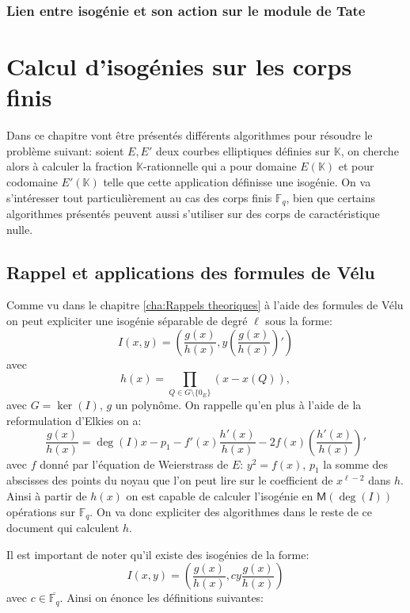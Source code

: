 \documentclass[10pt,a4paper]{book}
\theoremstyle{plain}
\theoremstyle{definition}
\theoremstyle{definition}
\theoremstyle{definition}
\theoremstyle{definition}
\theoremstyle{remark}
\theoremstyle{remark}
\begin{document}
\subsection{Lien entre isogénie et son action sur le module de Tate}

\chapter{Calcul d'isogénies sur les corps finis}
Dans ce chapitre vont être présentés différents algorithmes pour résoudre le problème suivant: soient $E, E'$ deux courbes elliptiques définies sur $\mathbb{K}$, on cherche alors à calculer la fraction $\mathbb{K}$-rationnelle qui a pour domaine $E(\mathbb{K})$ et pour codomaine $E'(\mathbb{K})$  telle que  cette application  définisse une isogénie.
On va s'intéresser tout particulièrement au cas des corps finis $\mathbb{F}_q$, bien que certains algorithmes présentés peuvent aussi s'utiliser sur des corps de caractéristique nulle.

\section{Rappel et applications des formules de Vélu}
Comme vu dans le chapitre \ref{cha:Rappels theoriques} à l'aide des formules de Vélu on peut expliciter une isogénie séparable de degré $\ell$ sous la forme:
\begin{equation} 
\label{eq:velu:gh}
I(x,y)=\left(\frac{g(x)}{h(x)},y\left( \frac{g(x)}{h(x)} \right)'\right)
\end{equation}
avec 
\begin{equation*}
h(x)=\prod_{Q \in G \setminus \{0_E\}}(x-x(Q)),
\end{equation*}
avec $G=\ker(I)$, $g$ un polynôme. On rappelle qu'en plus à l'aide de la reformulation d'Elkies on a:
\begin{equation}
\label{eq:vel:elk}
\frac{g(x)}{h(x)}= \deg(I) x -p_1 - f'(x) \frac{h'(x)}{h(x)} -2f(x)  \left(\frac{h'(x)}{h(x)}\right)'
\end{equation}
avec $f$ donné par l'équation de Weierstrass de $E$: $y^2=f(x)$, $p_1$ la somme des abscisses des points du noyau que l'on peut lire sur le coefficient de $x^{\ell-2}$ dans $h$. Ainsi à partir de $h(x)$ on est capable de calculer l'isogénie en $\mathsf{M}(\deg(I))$ opérations sur $\mathbb{F}_q$. On va donc expliciter des algorithmes dans le reste de ce document qui calculent $h$.


Il est important de noter qu'il existe des isogénies de la forme:
\begin{equation}
\label{eq:iso:gen}
I(x,y)=\left( \frac{g(x)}{h(x)},cy\frac{g(x)}{h(x)} \right)
\end{equation}
avec $c \in \overline{\mathbb{F}_q}$. Ainsi on énonce les définitions suivantes:
\end{document}
